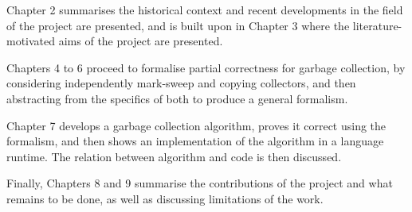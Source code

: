 Chapter 2 summarises the historical context and recent developments in
the field of the project are presented, and is built upon in Chapter 3
where the literature-motivated aims of the project are presented.

Chapters 4 to 6 proceed to formalise partial correctness for
garbage collection, by considering independently mark-sweep and
copying collectors, and then abstracting from the specifics of both to
produce a general formalism.

Chapter 7 develops a garbage collection algorithm, proves it
correct using the formalism, and then shows an implementation of the
algorithm in a language runtime. The relation between algorithm and
code is then discussed.

Finally, Chapters 8 and 9 summarise the contributions of the project
and what remains to be done, as well as discussing limitations of the
work.
